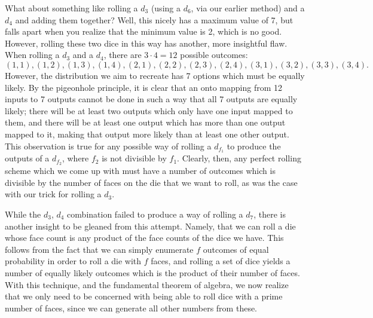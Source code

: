 \documentclass{article}
\begin{document}
\par What about something like rolling a $d_3$ (using a $d_6$, via our earlier method) and a $d_4$ and adding them together?
Well, this nicely has a maximum value of 7, but falls apart when you realize that the minimum value is 2, which is no good.
However, rolling these two dice in this way has another, more insightful flaw.
When rolling a $d_3$ and a $d_4$, there are $3 \cdot 4 = 12$ possible outcomes: $$(1, 1), (1, 2), (1, 3), (1, 4), (2, 1), (2, 2), (2, 3), (2, 4), (3, 1), (3, 2), (3, 3), (3, 4).$$
However, the distribution we aim to recreate has 7 options which must be equally likely.
By the pigeonhole principle, it is clear that an onto mapping from 12 inputs to 7 outputs cannot be done in such a way that all 7 outputs are equally likely; there will be at least two outputs which only have one input mapped to them, and there will be at least one output which has more than one output mapped to it, making that output more likely than at least one other output.
This observation is true for any possible way of rolling a $d_{f_1}$ to produce the outputs of a $d_{f_2}$, where $f_2$ is not divisible by $f_1$.
Clearly, then, any perfect rolling scheme which we come up with must have a number of outcomes which is divisible by the number of faces on the die that we want to roll, as was the case with our trick for rolling a $d_3$.

\par While the $d_3$, $d_4$ combination failed to produce a way of rolling a $d_7$, there is another insight to be gleaned from this attempt.
Namely, that we can roll a die whose face count is any product of the face counts of the dice we have. 
This follows from the fact that we can simply enumerate $f$ outcomes of equal probability in order to roll a die with $f$ faces, and rolling a set of dice yields a number of equally likely outcomes which is the product of their number of faces.
With this technique, and the fundamental theorem of algebra, we now realize that we only need to be concerned with being able to roll dice with a prime number of faces, since we can generate all other numbers from these.
\end{document}
